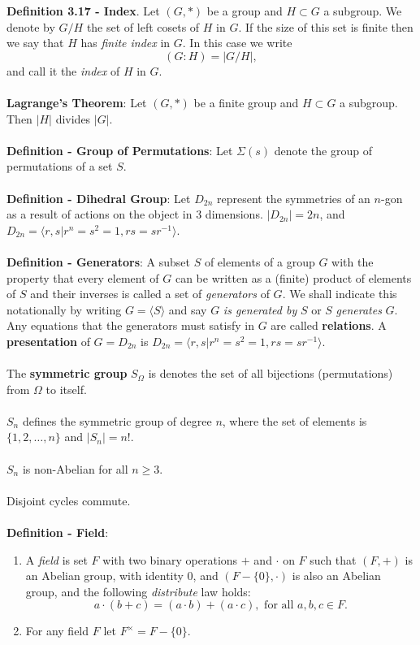 \documentclass{article}
\begin{document}
\textbf{Definition 3.17 - Index}. Let $(G, *)$ be a group and $H \subset G$ a subgroup. We denote by $G / H$ the set of left cosets of $H$ in $G$. If the size of this set is finite then we say that $H$ has \textit{finite index} in $G$. In this case we write $$(G:H) = |G / H|,$$ and call it the \textit{index} of $H$ in $G$. \\ \\
\textbf{Lagrange's Theorem}: Let $(G, *)$ be a finite group and $H \subset G$ a subgroup. Then $|H|$ divides $|G|$. \\ \\
\textbf{Definition - Group of Permutations}: Let $\Sigma(s)$ denote the group of permutations of a set $S$. \\ \\
\textbf{Definition - Dihedral Group}: Let $D_{2n}$ represent the symmetries of an $n$-gon as a result of actions on the object in 3 dimensions. $|D_{2n}| = 2n$, and $D_{2n} = \langle r, s | r^n = s^2 = 1, rs = sr^{-1} \rangle$. \\ \\
\textbf{Definition - Generators}: A subset $S$ of elements of a group $G$ with the property that every element of $G$ can be written as a (finite) product of elements of $S$ and their inverses is called a set of \textit{generators} of $G$. We shall indicate this notationally by writing $G = \langle S \rangle$ and say $G$ \textit{is generated by} $S$ or $S$ \textit{generates} $G$. Any equations that the generators must satisfy in $G$ are called \textbf{relations}. A \textbf{presentation} of $G = D_{2n}$ is $D_{2n} = \langle r, s | r^n = s^2 = 1, rs = sr^{-1} \rangle$. \\ \\
The \textbf{symmetric group} $S_{\Omega}$ is denotes the set of all bijections (permutations) from $\Omega$ to itself. \\ \\
$S_n$ defines the symmetric group of degree $n$, where the set of elements is $\{1, 2, \dots, n\}$ and $|S_n| = n!$. \\ \\
$S_n$ is non-Abelian for all $n \geq 3$. \\ \\
Disjoint cycles commute. \\ \\
\textbf{Definition - Field}: \begin{enumerate}
    \item A \textit{field} is set $F$ with two binary operations $+$ and $\cdot$ on $F$ such that $(F, +)$ is an Abelian group, with identity 0, and $(F - \{0\}, \cdot)$ is also an Abelian group, and the following \textit{distribute} law holds: $$a \cdot (b + c) = (a \cdot b) + (a \cdot c), \text{ for all } a, b, c \in F.$$
    \item For any field $F$ let $F^\times = F - \{0\}$.
\end{enumerate}
\end{document}
